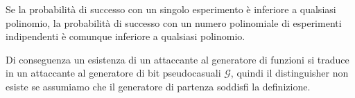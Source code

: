 Se la probabilità di successo con un singolo esperimento è inferiore a qualsiasi polinomio,
la probabilità di successo
con un numero polinomiale di esperimenti indipendenti è comunque inferiore a qualsiasi polinomio.

Di conseguenza un esistenza di un attaccante al generatore di funzioni si traduce 
in un attaccante al generatore di bit pseudocasuali $\mathcal{G}$, quindi 
il distinguisher non esiste se assumiamo  che il generatore di partenza soddisfi 
la definizione.
